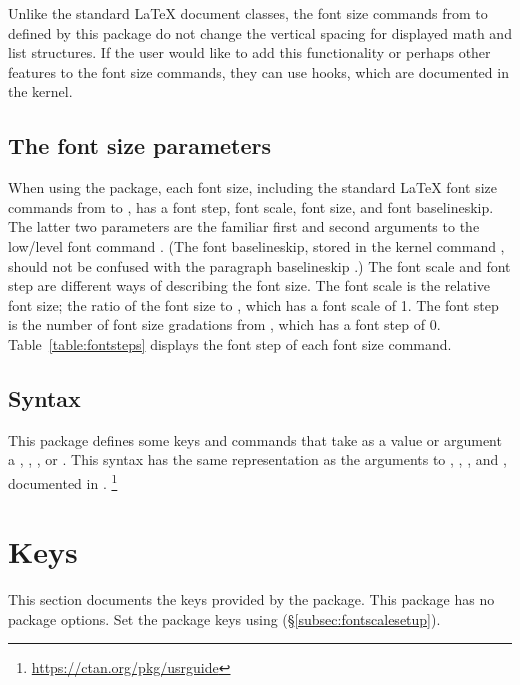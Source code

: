 \documentclass{beery}
\begin{document}
Unlike the standard \LaTeX{} document classes, the font size commands from  to  defined by this package do not change the vertical spacing for displayed math and list structures.
If the user would like to add this functionality or perhaps other features to the font size commands, they can use hooks, which are documented in the \LaTeXe{} kernel.

\subsection{The font size parameters}
\label{subsec:fontsizeparameters}

When using the  package, each font size, including the standard \LaTeX{} font size commands from  to , has a font step, font scale, font size, and font baselineskip.
The latter two parameters are the familiar first and second arguments to the low\-/level font command .
(The font baselineskip, stored in the kernel command , should not be confused with the paragraph baselineskip .)
The font scale and font step are different ways of describing the font size.
The font scale is the relative font size; the ratio of the font size to , which has a font scale of \num{1}.
The font step is the number of font size gradations from , which has a font step of \num{0}.
Table~\ref{table:fontsteps} displays the font step of each font size command.



\subsection{Syntax}
\label{subsec:syntax}

This package defines some keys and commands that take as a value or argument a , , , or .
This syntax has the same representation as the arguments to , , , and , documented in .%
\footnote{\url{https://ctan.org/pkg/usrguide}}


\section{Keys}
\label{sec:keys}

This section documents the keys provided by the  package.
This package has no package options.
Set the package keys using  (\S\ref{subsec:fontscalesetup}).
\end{document}
